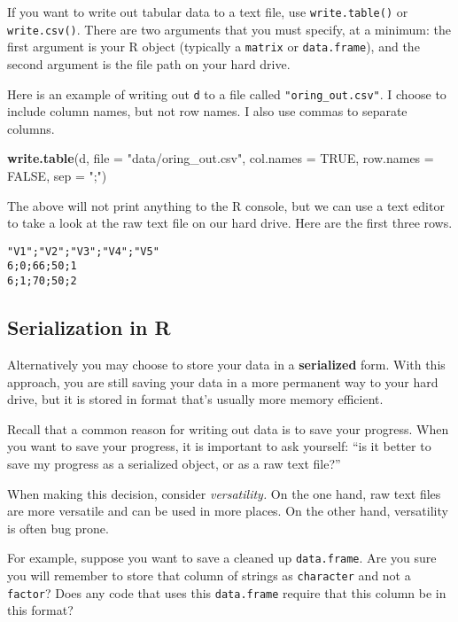 \documentclass[12pt,krantz2]{krantz}
\makeatletter
\newenvironment{Shaded}{\begin{snugshade}}{\end{snugshade}}
\newcommand{\DataTypeTok}[1]{\textcolor[rgb]{0.27,0.27,0.27}{#1}}
\newcommand{\KeywordTok}[1]{\textcolor[rgb]{0.27,0.27,0.27}{\textbf{#1}}}
\newcommand{\NormalTok}[1]{#1}
\newcommand{\OtherTok}[1]{\textcolor[rgb]{0.37,0.37,0.37}{#1}}
\newcommand{\StringTok}[1]{\textcolor[rgb]{0.5,0.5,0.5}{#1}}
\newenvironment{kframe}{%
\medskip{}
\setlength{\fboxsep}{.8em}
 \def\at@end@of@kframe{}%
 \ifinner\ifhmode%
  \def\at@end@of@kframe{\end{minipage}}%
  \begin{minipage}{\columnwidth}%
 \fi\fi%
 \def\FrameCommand##1{\hskip\@totalleftmargin \hskip-\fboxsep
 \colorbox{shadecolor}{##1}\hskip-\fboxsep
     \hskip-\linewidth \hskip-\@totalleftmargin \hskip\columnwidth}%
 \MakeFramed {\advance\hsize-\width
   \@totalleftmargin\z@ \linewidth\hsize
   \@setminipage}}%
 {\par\unskip\endMakeFramed%
 \at@end@of@kframe}
\renewenvironment{Shaded}{\begin{kframe}}{\end{kframe}}
\makeatother
\begin{document}
If you want to write out tabular data to a text file, use \texttt{write.table()} or \texttt{write.csv()}. There are two arguments that you must specify, at a minimum: the first argument is your R object (typically a \texttt{matrix} or \texttt{data.frame}), and the second argument is the file path on your hard drive.

Here is an example of writing out \texttt{d} to a file called \texttt{"oring\_out.csv"}. I choose to include column names, but not row names. I also use commas to separate columns.

\begin{Shaded}
\begin{Highlighting}[]
\KeywordTok{write.table}\NormalTok{(d, }\DataTypeTok{file =} \StringTok{"data/oring_out.csv"}\NormalTok{, }
            \DataTypeTok{col.names =} \OtherTok{TRUE}\NormalTok{, }\DataTypeTok{row.names =} \OtherTok{FALSE}\NormalTok{, }\DataTypeTok{sep =} \StringTok{";"}\NormalTok{)}
\end{Highlighting}
\end{Shaded}

The above will not print anything to the R console, but we can use a text editor to take a look at the raw text file on our hard drive. Here are the first three rows.

\begin{verbatim}
"V1";"V2";"V3";"V4";"V5"
6;0;66;50;1
6;1;70;50;2
\end{verbatim}

\hypertarget{serialization-in-r}{%
\subsection{Serialization in R}\label{serialization-in-r}}

Alternatively you may choose to store your data in a \textbf{serialized} form. With this approach, you are still saving your data in a more permanent way to your hard drive, but it is stored in format that's usually more memory efficient.

\begin{rmd-details}
Recall that a common reason for writing out data is to save your progress. When you want to save your progress, it is important to ask yourself: ``is it better to save my progress as a serialized object, or as a raw text file?''

When making this decision, consider \emph{versatility.} On the one hand, raw text files are more versatile and can be used in more places. On the other hand, versatility is often bug prone.

For example, suppose you want to save a cleaned up \texttt{data.frame}. Are you sure you will remember to store that column of strings as \texttt{character} and not a \texttt{factor}? Does any code that uses this \texttt{data.frame} require that this column be in this format?

\end{rmd-details}
\end{document}
